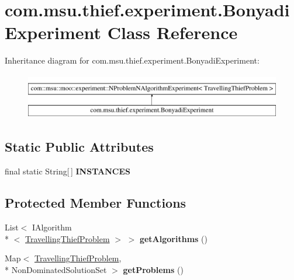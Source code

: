 \hypertarget{classcom_1_1msu_1_1thief_1_1experiment_1_1BonyadiExperiment}{\section{com.\-msu.\-thief.\-experiment.\-Bonyadi\-Experiment Class Reference}
\label{classcom_1_1msu_1_1thief_1_1experiment_1_1BonyadiExperiment}
}
Inheritance diagram for com.\-msu.\-thief.\-experiment.\-Bonyadi\-Experiment\-:\begin{figure}[H]
\begin{center}
\leavevmode
\includegraphics[height=2.000000cm]{classcom_1_1msu_1_1thief_1_1experiment_1_1BonyadiExperiment}
\end{center}
\end{figure}
\subsection*{Static Public Attributes}
\begin{DoxyCompactItemize}
\item 
final static String\mbox{[}$\,$\mbox{]} {\bfseries I\-N\-S\-T\-A\-N\-C\-E\-S}
\end{DoxyCompactItemize}
\subsection*{Protected Member Functions}
\begin{DoxyCompactItemize}
\item 
\hypertarget{classcom_1_1msu_1_1thief_1_1experiment_1_1BonyadiExperiment_a1a589a4c2c4d1339dea4ac5dbbd71503}{List$<$ I\-Algorithm\\*
$<$ \hyperlink{classcom_1_1msu_1_1thief_1_1problems_1_1TravellingThiefProblem}{Travelling\-Thief\-Problem} $>$ $>$ {\bfseries get\-Algorithms} ()}\label{classcom_1_1msu_1_1thief_1_1experiment_1_1BonyadiExperiment_a1a589a4c2c4d1339dea4ac5dbbd71503}

\item 
\hypertarget{classcom_1_1msu_1_1thief_1_1experiment_1_1BonyadiExperiment_a2550205e73a7969136ed1e022b633685}{Map$<$ \hyperlink{classcom_1_1msu_1_1thief_1_1problems_1_1TravellingThiefProblem}{Travelling\-Thief\-Problem}, \\*
Non\-Dominated\-Solution\-Set $>$ {\bfseries get\-Problems} ()}\label{classcom_1_1msu_1_1thief_1_1experiment_1_1BonyadiExperiment_a2550205e73a7969136ed1e022b633685}

\end{DoxyCompactItemize}



